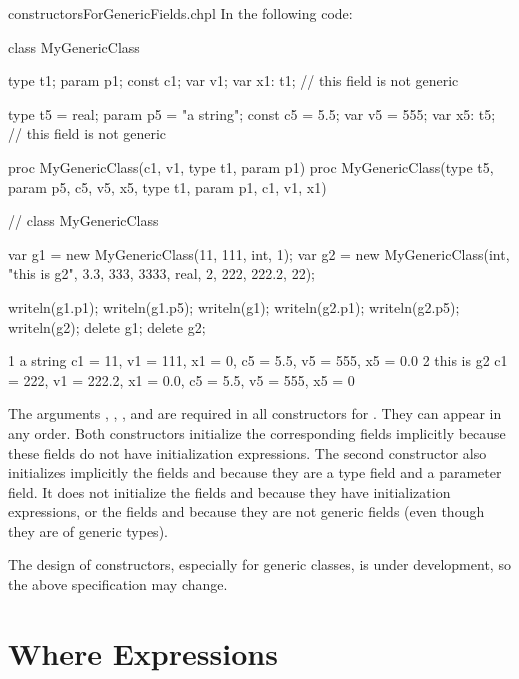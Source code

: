 \begin{chapelexample}{constructorsForGenericFields.chpl}
In the following code:
\begin{chapel}
class MyGenericClass {
  type t1;
  param p1;
  const c1;
  var v1;
  var x1: t1; // this field is not generic

  type t5 = real;
  param p5 = "a string";
  const c5 = 5.5;
  var v5 = 555;
  var x5: t5; // this field is not generic

  proc MyGenericClass(c1, v1, type t1, param p1) { }
  proc MyGenericClass(type t5, param p5, c5, v5, x5,
                     type t1, param p1, c1, v1, x1) { }
}  // class MyGenericClass

var g1 = new MyGenericClass(11, 111, int, 1);
var g2 = new MyGenericClass(int, "this is g2", 3.3, 333, 3333,
                            real, 2, 222, 222.2, 22);
\end{chapel}
\begin{chapelpost}
writeln(g1.p1);
writeln(g1.p5);
writeln(g1);
writeln(g2.p1);
writeln(g2.p5);
writeln(g2);
delete g1;
delete g2;
\end{chapelpost}
\begin{chapeloutput}
1
a string
{c1 = 11, v1 = 111, x1 = 0, c5 = 5.5, v5 = 555, x5 = 0.0}
2
this is g2
{c1 = 222, v1 = 222.2, x1 = 0.0, c5 = 5.5, v5 = 555, x5 = 0}
\end{chapeloutput}
The arguments , , , and  are
required in all constructors for . They can appear
in any order. Both  constructors initialize the
corresponding fields implicitly because these fields do not have initialization
expressions. The second constructor also initializes implicitly
the fields  and  because they are a type field
and a parameter field. It does not initialize the fields 
and  because they have initialization expressions, or
the fields  and  because they are not generic fields
(even though they are of generic types).
\end{chapelexample}

\begin{openissue}
The design of constructors, especially for generic classes, is
under development, so the above specification may change.
\end{openissue}

\pagebreak
\section{Where Expressions}
\label{Where_Expressions}

